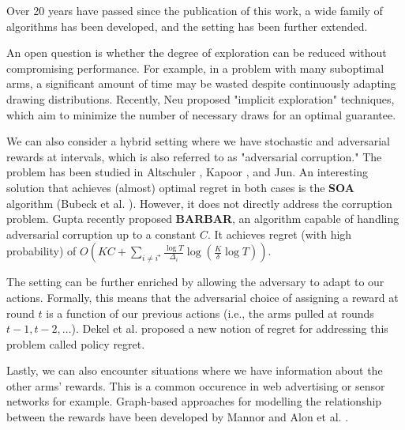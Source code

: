 \documentclass[12pt,a4paper]{article}
\begin{document}
Over 20 years have passed since the publication of this work, a wide family of algorithms has been developed, and the setting has been further extended.

An open question is whether the degree of exploration can be reduced without compromising performance. For example, in a problem with many suboptimal arms, a significant amount of time may be wasted despite continuously adapting drawing distributions. Recently, Neu \cite{neu} proposed "implicit exploration" techniques, which aim to minimize the number of necessary draws for an optimal guarantee.

We can also consider a hybrid setting where we have stochastic and adversarial rewards at intervals, which is also referred to as "adversarial corruption." The problem has been studied in Altschuler \cite{alts}, Kapoor \cite{kapoor}, and Jun\cite{jun}. An interesting solution that achieves (almost) optimal regret in both cases is the \textbf{SOA} algorithm (Bubeck et al. \cite{seb}). However, it does not directly address the corruption problem. Gupta \cite{guptakoren} recently proposed \textbf{BARBAR}, an algorithm capable of handling adversarial corruption up to a constant $C$. It achieves regret (with high probability) of $O(KC + \sum_{i\neq i^\star}^{}\frac{\log T}{\Delta_i}\log(\frac{K}{\delta}\log T))$.

The setting can be further enriched by allowing the adversary to adapt to our actions. Formally, this means that the adversarial choice of assigning a reward at round $t$ is a function of our previous actions (i.e., the arms pulled at rounds $t-1, t-2, \dots$). Dekel et al. \cite{dekel} proposed a new notion of regret for addressing this problem called policy regret.

Lastly, we can also encounter situations where we have information about the other arms' rewards. This is a common occurence in web advertising or sensor networks for example.  Graph-based approaches for modelling the relationship between the rewards have been developed by Mannor \cite{mannor} and Alon et al. \cite{alon}.



 
\end{document}
